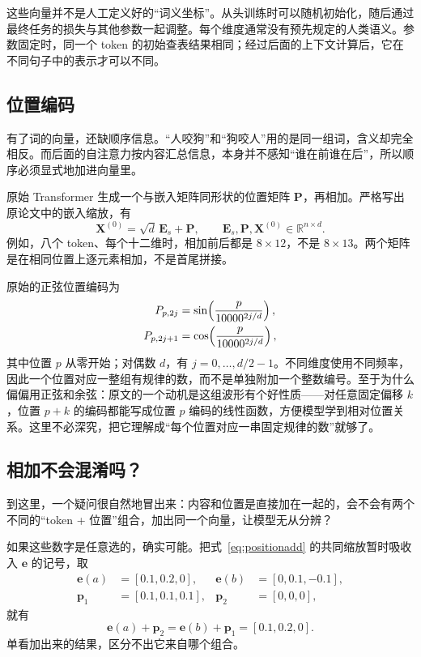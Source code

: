 \documentclass[UTF8,a4paper,12pt]{ctexart}
\numberwithin{equation}{section}
\newcommand{\R}{\mathbb{R}}
\begin{document}
这些向量并不是人工定义好的``词义坐标''。从头训练时可以随机初始化，随后通过最终任务的损失与其他参数一起调整。每个维度通常没有预先规定的人类语义。参数固定时，同一个 token 的初始查表结果相同；经过后面的上下文计算后，它在不同句子中的表示才可以不同。

\subsection{位置编码}

有了词的向量，还缺顺序信息。``人咬狗''和``狗咬人''用的是同一组词，含义却完全相反。而后面的自注意力按内容汇总信息，本身并不感知``谁在前谁在后''，所以顺序必须显式地加进向量里。

原始 Transformer 生成一个与嵌入矩阵同形状的位置矩阵 $\bm P$，再相加。严格写出原论文中的嵌入缩放，有
\begin{equation}
\bm X^{(0)}=\sqrt d\,\bm E_s+\bm P,
\qquad \bm E_s,\bm P,\bm X^{(0)}\in\R^{n\times d}.
\label{eq:positionadd}
\end{equation}
例如，八个 token、每个十二维时，相加前后都是 $8\times12$，不是 $8\times13$。两个矩阵是在相同位置上逐元素相加，不是首尾拼接。

原始的正弦位置编码为
\begin{align}
P_{p,2j}&=\sin\!\left(\frac{p}{10000^{2j/d}}\right),\notag\\
P_{p,2j+1}&=\cos\!\left(\frac{p}{10000^{2j/d}}\right),
\label{eq:sinusoidal}
\end{align}
其中位置 $p$ 从零开始；对偶数 $d$，有 $j=0,\ldots,d/2-1$。不同维度使用不同频率，因此一个位置对应一整组有规律的数，而不是单独附加一个整数编号。至于为什么偏偏用正弦和余弦：原文的一个动机是这组波形有个好性质——对任意固定偏移 $k$，位置 $p+k$ 的编码都能写成位置 $p$ 编码的线性函数，方便模型学到相对位置关系。这里不必深究，把它理解成``每个位置对应一串固定规律的数''就够了。

\subsection{相加不会混淆吗？}

到这里，一个疑问很自然地冒出来：内容和位置是直接加在一起的，会不会有两个不同的``token + 位置''组合，加出同一个向量，让模型无从分辨？

如果这些数字是任意选的，确实可能。把式~\eqref{eq:positionadd} 的共同缩放暂时吸收入 $\bm e$ 的记号，取
\begin{align*}
\bm e(a)&=[0.1,0.2,0],&\bm e(b)&=[0,0.1,-0.1],\\
\bm p_1&=[0.1,0.1,0.1],&\bm p_2&=[0,0,0],
\end{align*}
就有
\begin{equation}
\bm e(a)+\bm p_2=\bm e(b)+\bm p_1=[0.1,0.2,0].
\label{eq:collision}
\end{equation}
单看加出来的结果，区分不出它来自哪个组合。
\end{document}
